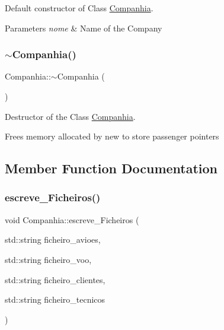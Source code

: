 Default constructor of Class \hyperlink{class_companhia}{Companhia}. 


\begin{DoxyParams}{Parameters}
{\em nome} & Name of the Company \\
\hline
\end{DoxyParams}
\mbox{\label{class_companhia_ac8d787355ae09623101260f59e7255cc}} 
\subsubsection{\texorpdfstring{$\sim$\+Companhia()}{~Companhia()}}
{\footnotesize\ttfamily Companhia\+::$\sim$\+Companhia (\begin{DoxyParamCaption}{ }\end{DoxyParamCaption})}



Destructor of the Class \hyperlink{class_companhia}{Companhia}. 

Frees memory allocated by new to store passenger pointers 

\subsection{Member Function Documentation}
\mbox{\label{class_companhia_a04bb39107602deacf67a4667887cf562}} 
\subsubsection{\texorpdfstring{escreve\+\_\+\+Ficheiros()}{escreve\_Ficheiros()}}
{\footnotesize\ttfamily void Companhia\+::escreve\+\_\+\+Ficheiros (\begin{DoxyParamCaption}\item[{std\+::string}]{ficheiro\+\_\+avioes,  }\item[{std\+::string}]{ficheiro\+\_\+voo,  }\item[{std\+::string}]{ficheiro\+\_\+clientes,  }\item[{std\+::string}]{ficheiro\+\_\+tecnicos }\end{DoxyParamCaption})}



